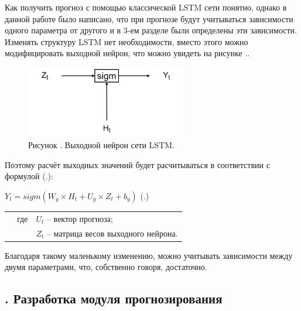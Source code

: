 {\gostFont

  \par \redline Как получить прогноз с помощью классической LSTM сети понятно, однако в данной работе было написано, что при прогнозе будут учитываться зависимости одного параметра от другого и в 3-ем разделе были определены эти зависимости. Изменять структуру LSTM нет необходимости, вместо этого можно модифицировать выходной нейрон, что можно увидеть на рисунке \thechaptercntr .\theimagecntr.

  \begin{figure}[H]
    \centering
    \def\svgwidth{\textwidth}
    \includegraphics[width=70mm]{images/LSTMOutNeuron.png}
    \caption*{\gostFont Рисунок \thechaptercntr .\theimagecntr \spc {--} Выходной нейрон сети LSTM.}
    \label{fig:LSTMBlackBox}
  \end{figure} \addtocounter{imagecntr}{1}

  \par \redline Поэтому расчёт выходных значений будет расчитываться в соответствии с формулой (\thechaptercntr .\theformulacntr): 

  \formulaspace \par \redline 
    $Y_t = sigm(W_y \times H_t + U_y \times Z_t + b_y)$
    \hfill (\thechaptercntr .\theformulacntr) \redline
  \formulaspace \addtocounter{formulacntr}{1}

  \begin{tabular}{p{}p{}p{}}
		& где  & $U_t$ {--} вектор прогноза; \\
		& 	   & $Z_t$ {--} матрица весов выходного нейрона. \\
  \end{tabular}
  
  \par \redline Благодаря такому маленькому изменению, можно учитывать зависимости между двумя параметрами, что, собственно говоря, достаточно. 

  \par 
}

\subtitlespace

\subsection*{ 
  \gostTitleFont
  \redline
  \thechaptercntr .\thesubchaptercntr \spc 
  Разработка модуля прогнозирования
} \addtocounter{subchaptercntr}{1} 
  
